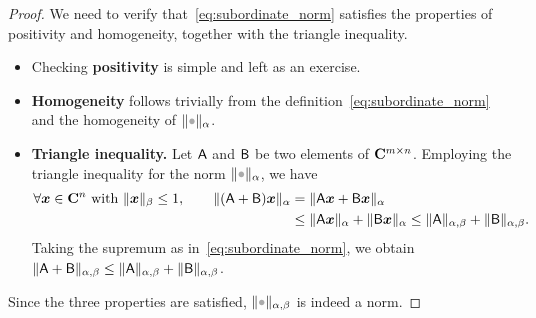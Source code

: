 \begin{proof}
    We need to verify that~\eqref{eq:subordinate_norm} satisfies the properties of positivity and homogeneity,
    together with the triangle inequality.
    \begin{itemize}
        \item
            Checking \textbf{positivity} is simple and left as an exercise.

        \item
            \textbf{Homogeneity} follows trivially from the definition~\eqref{eq:subordinate_norm}
            and the homogeneity of $\norm{\placeholder}_{\alpha}$.

        \item
            \textbf{Triangle inequality.}
            Let $\mathsf A$ and $\mathsf B$ be two elements of $\mathbf C^{m \times n}$.
            Employing the triangle inequality for the norm $\norm{\placeholder}_{\alpha}$,
            we have
            \begin{align*}
                \forall \mathbf{\boldsymbol{x}} \in \mathbf C^{n} ~ \text{with} ~ \lVert\mathbf{\boldsymbol{x}}\rVert_{\beta}\leq 1, \qquad
                \lVert(\mathsf A + \mathsf B) \mathbf{\boldsymbol{x}}\rVert_{\alpha}
                &= \lVert\mathsf A \mathbf{\boldsymbol{x}} + \mathsf B \mathbf{\boldsymbol{x}}\rVert_{\alpha} \\
                &\leq \lVert\mathsf A \mathbf{\boldsymbol{x}}\rVert_{\alpha} + \lVert\mathsf B \mathbf{\boldsymbol{x}}\rVert_{\alpha}
                \leq \lVert\mathsf A\rVert_{\alpha,\beta} + \lVert\mathsf B\rVert_{\alpha,\beta}.
            \end{align*}
            Taking the supremum as in~\eqref{eq:subordinate_norm},
            we obtain $\lVert\mathsf A + \mathsf B\rVert_{\alpha,\beta} \leq \lVert\mathsf A\rVert_{\alpha,\beta} + \lVert\mathsf B\rVert_{\alpha,\beta}$.
    \end{itemize}
    Since the three properties are satisfied, $\norm{\placeholder}_{\alpha,\beta}$ is indeed a norm.
\end{proof}

